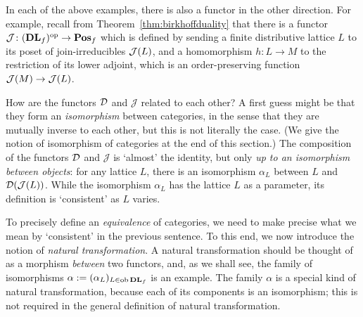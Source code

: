 \begin{example}
\begin{enumerate}
\end{enumerate}
\end{example}
In each of the above examples, there is also a functor in the other direction. For example, recall from Theorem~\ref{thm:birkhoffduality} that there is a functor $\mathcal{J} \colon (\mathbf{DL}_f)^{\mathrm{op}} \to \mathbf{Pos}_f$ which is defined by sending a finite distributive lattice $L$ to its poset of join-irreducibles $\mathcal{J}(L)$, and a homomorphism $h \colon L \to M$ to the restriction of its lower adjoint, which is an order-preserving function $\mathcal{J}(M) \to \mathcal{J}(L)$.

How are the functors $\mathcal{D}$ and $\mathcal{J}$ related to each other? A first guess might be that they form an \emph{isomorphism} between categories, in the sense that they are mutually inverse to each other, but this is not literally the case. (We give the notion of isomorphism of categories at the end of this section.) The composition of the functors $\mathcal{D}$ and $\mathcal{J}$ is `almost' the identity, but only \emph{up to an isomorphism between objects}: for any lattice $L$, there is an isomorphism $\alpha_L$ between $L$ and $\mathcal{D}(\mathcal{J}(L))$. While the isomorphism $\alpha_L$ has the lattice $L$ as a parameter, its definition is `consistent' as $L$ varies.

To precisely define an \emph{equivalence} of categories, we need to make precise what we mean by `consistent' in the previous sentence. To this end, we now introduce the notion of \emph{natural transformation}. A natural transformation should be thought of as a morphism \emph{between} two functors, and, as we shall see, the family of isomorphisms $\alpha := (\alpha_L)_{L \in \operatorname{\mathrm{ob}} \mathbf{DL}_f}$ is an example. The family $\alpha$ is a special kind of natural transformation, because each of its components is an isomorphism; this is not required in the general definition of natural transformation. %

